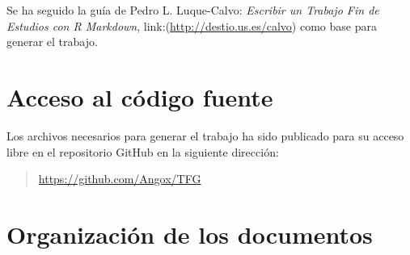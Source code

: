\documentclass[12pt,a4paper,]{book}
\numberwithin{dummy}{section}
\theoremstyle{ocrenumbox}
\theoremstyle{blacknumex}
\theoremstyle{blacknumbox}
\theoremstyle{ocrenum}
\theoremstyle{ocrenum}
\begin{document}
Se ha seguido la guía de Pedro L. Luque-Calvo: \emph{Escribir un Trabajo
Fin de Estudios con R Markdown}, link:(\url{http://destio.us.es/calvo})
como base para generar el trabajo.

\hypertarget{acceso-al-cuxf3digo-fuente}{%
\section{Acceso al código fuente}\label{acceso-al-cuxf3digo-fuente}}

Los archivos necesarios para generar el trabajo ha sido publicado para
su acceso libre en el repositorio GitHub en la siguiente dirección:

\begin{quote}
\url{https://github.com/Angox/TFG}
\end{quote}

\hypertarget{organizaciuxf3n-de-los-documentos}{%
\section{Organización de los
documentos}\label{organizaciuxf3n-de-los-documentos}}
\end{document}
